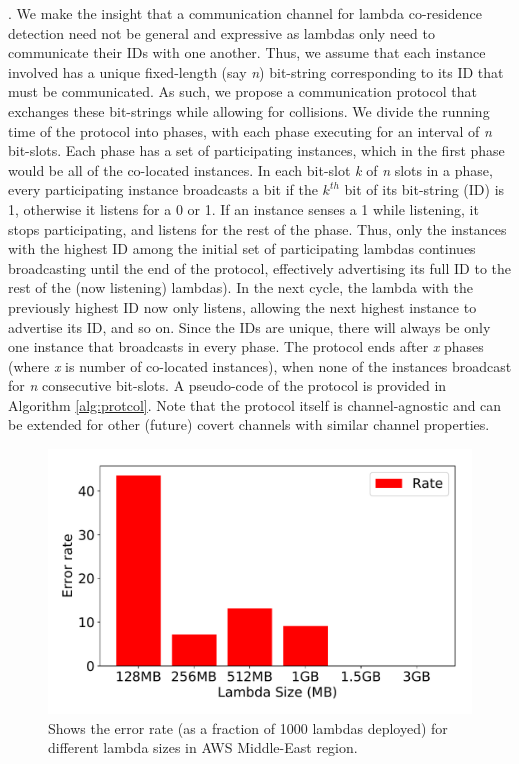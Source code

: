 .
We make the insight that a communication channel for lambda co-residence detection 
need not be general and expressive as lambdas only need to communicate their IDs with one 
another. Thus, we assume that each instance
involved has a unique fixed-length (say \emph{n}) bit-string corresponding to
its ID that must be communicated.  As such, we propose a communication protocol
that exchanges these bit-strings while allowing for collisions. We divide the
running time of the protocol into phases, with each phase executing for an
interval of \textit{n} bit-slots. Each phase has a set of participating
instances, which in the first phase would be all of the co-located instances. In
each bit-slot \textit{k} of \textit{n} slots in a phase, every participating
instance broadcasts a bit if the $k^{th}$ bit of its bit-string (ID) is 1,
otherwise it listens for a 0 or 1. If an instance senses a 1 while listening, it
stops participating, and listens for the rest of the phase. Thus, only the
instances with the highest ID among the initial set of participating lambdas
continues broadcasting until the end of the protocol, effectively advertising
its full ID to the rest of the (now listening) lambdas). In the next cycle, the
lambda with the previously highest ID now only listens, allowing the next
highest instance to advertise its ID, and so on.  Since the IDs are unique,
there will always be only one instance that broadcasts in every phase. The
protocol ends after \textit{x} phases (where \textit{x} is number of co-located
instances), when none of the instances broadcast for \textit{n} consecutive
bit-slots.  A pseudo-code of the protocol is provided in Algorithm
\ref{alg:protcol}. Note that the protocol itself is channel-agnostic and can be
extended for other (future) covert channels with similar channel properties.

\begin{figure}[!t]
  \includegraphics[width=.99\linewidth]{fig/errorrates.pdf}
  \caption{Shows the error rate (as a fraction of 1000 lambdas deployed) for different lambda sizes in AWS Middle-East region. 
\label{fig:errorrates}}
\end{figure}

